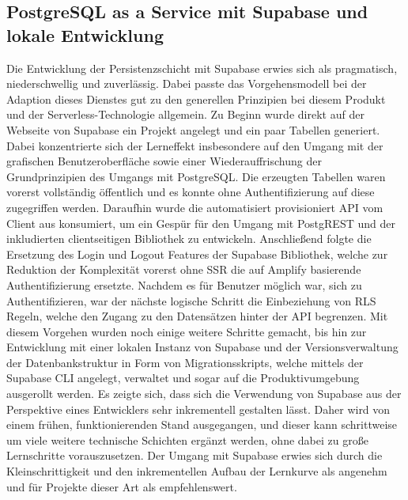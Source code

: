 \subsection{PostgreSQL as a Service mit Supabase und lokale Entwicklung}
Die Entwicklung der Persistenzschicht mit Supabase erwies sich als pragmatisch, niederschwellig und zuverlässig. Dabei passte das Vorgehensmodell bei der Adaption dieses Dienstes gut zu den generellen Prinzipien bei diesem Produkt und der Serverless-Technologie allgemein. Zu Beginn wurde direkt auf der Webseite von Supabase ein Projekt angelegt und ein paar Tabellen generiert. Dabei konzentrierte sich der Lerneffekt insbesondere auf den Umgang mit der grafischen Benutzeroberfläche sowie einer Wiederauffrischung der Grundprinzipien des Umgangs mit PostgreSQL. Die erzeugten Tabellen waren vorerst vollständig öffentlich und es konnte ohne Authentifizierung auf diese zugegriffen werden. Daraufhin wurde die automatisiert provisioniert API vom Client aus konsumiert, um ein Gespür für den Umgang mit PostgREST und der inkludierten clientseitigen Bibliothek zu entwickeln. Anschließend folgte die Ersetzung des Login und Logout Features der Supabase Bibliothek, welche zur Reduktion der Komplexität vorerst ohne SSR die auf Amplify basierende Authentifizierung ersetzte. Nachdem es für Benutzer möglich war, sich zu Authentifizieren, war der nächste logische Schritt die Einbeziehung von RLS Regeln, welche den Zugang zu den Datensätzen hinter der API begrenzen. Mit diesem Vorgehen wurden noch einige weitere Schritte gemacht, bis hin zur Entwicklung mit einer lokalen Instanz von Supabase und der Versionsverwaltung der Datenbankstruktur in Form von Migrationsskripts, welche mittels der Supabase CLI angelegt, verwaltet und sogar auf die Produktivumgebung ausgerollt werden. Es zeigte sich, dass sich die Verwendung von Supabase aus der Perspektive eines Entwicklers sehr inkrementell gestalten lässt. Daher wird von einem frühen, funktionierenden Stand ausgegangen, und dieser kann schrittweise um viele weitere technische Schichten ergänzt werden, ohne dabei zu große Lernschritte vorauszusetzen. Der Umgang mit Supabase erwies sich durch die Kleinschrittigkeit und den inkrementellen Aufbau der Lernkurve als angenehm und für Projekte dieser Art als empfehlenswert.

